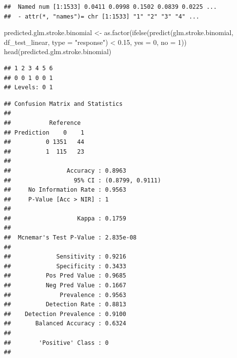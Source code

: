 \documentclass[
]{article}
\newenvironment{Shaded}{\begin{snugshade}}{\end{snugshade}}
\newcommand{\AttributeTok}[1]{\textcolor[rgb]{0.77,0.63,0.00}{#1}}
\newcommand{\DecValTok}[1]{\textcolor[rgb]{0.00,0.00,0.81}{#1}}
\newcommand{\FloatTok}[1]{\textcolor[rgb]{0.00,0.00,0.81}{#1}}
\newcommand{\FunctionTok}[1]{\textcolor[rgb]{0.00,0.00,0.00}{#1}}
\newcommand{\NormalTok}[1]{#1}
\newcommand{\OtherTok}[1]{\textcolor[rgb]{0.56,0.35,0.01}{#1}}
\newcommand{\SpecialCharTok}[1]{\textcolor[rgb]{0.00,0.00,0.00}{#1}}
\newcommand{\StringTok}[1]{\textcolor[rgb]{0.31,0.60,0.02}{#1}}
\renewcommand{\=}[1]{\stackrel{#1}{=}}
\theoremstyle{definition}
\theoremstyle{remark}
\begin{document}
\begin{verbatim}
##  Named num [1:1533] 0.0411 0.0998 0.1502 0.0839 0.0225 ...
##  - attr(*, "names")= chr [1:1533] "1" "2" "3" "4" ...
\end{verbatim}

\begin{Shaded}
\begin{Highlighting}[]
\NormalTok{predicted.glm.stroke.binomial }\OtherTok{\textless{}{-}} \FunctionTok{as.factor}\NormalTok{(}\FunctionTok{ifelse}\NormalTok{(}\FunctionTok{predict}\NormalTok{(glm.stroke.binomial, df\_test\_linear, }\AttributeTok{type =} \StringTok{"response"}\NormalTok{) }\SpecialCharTok{\textless{}} \FloatTok{0.15}\NormalTok{, }\AttributeTok{yes =} \DecValTok{0}\NormalTok{, }\AttributeTok{no =} \DecValTok{1}\NormalTok{))}
\FunctionTok{head}\NormalTok{(predicted.glm.stroke.binomial)}
\end{Highlighting}
\end{Shaded}

\begin{verbatim}
## 1 2 3 4 5 6 
## 0 0 1 0 0 1 
## Levels: 0 1
\end{verbatim}

\begin{Shaded}
\end{Shaded}

\begin{verbatim}
## Confusion Matrix and Statistics
## 
##           Reference
## Prediction    0    1
##          0 1351   44
##          1  115   23
##                                           
##                Accuracy : 0.8963          
##                  95% CI : (0.8799, 0.9111)
##     No Information Rate : 0.9563          
##     P-Value [Acc > NIR] : 1               
##                                           
##                   Kappa : 0.1759          
##                                           
##  Mcnemar's Test P-Value : 2.835e-08       
##                                           
##             Sensitivity : 0.9216          
##             Specificity : 0.3433          
##          Pos Pred Value : 0.9685          
##          Neg Pred Value : 0.1667          
##              Prevalence : 0.9563          
##          Detection Rate : 0.8813          
##    Detection Prevalence : 0.9100          
##       Balanced Accuracy : 0.6324          
##                                           
##        'Positive' Class : 0               
## 
\end{verbatim}
\end{document}
